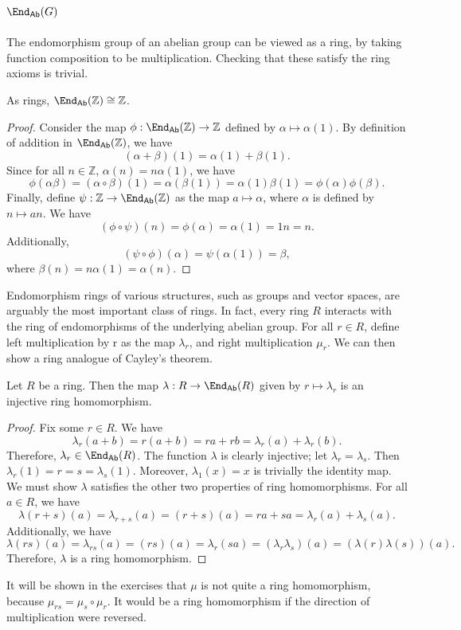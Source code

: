 \subsection{$\End_{\mathsf{Ab}}( G ) $}
The endomorphism group of an abelian group can be viewed as a ring, by taking function composition to be multiplication. Checking that these satisfy the ring axioms is trivial.
\begin{proposition}\label{prp:3.2.3}
	As rings, $\End_{\mathsf{Ab}}( \mathbb{Z} ) \cong \mathbb{Z}$.
\end{proposition}
\begin{proof}
	Consider the map $\phi : \End_{\mathsf{Ab}}( \mathbb{Z} )  \to \mathbb{Z}$ defined by $\alpha \mapsto \alpha (1)$. By definition of addition in $\End_{\mathsf{Ab}}( \mathbb{Z} ) $, we have
	\[
		(\alpha +\beta )(1)=\alpha (1)+\beta (1)
	.\]
	Since for all $n\in\mathbb{Z}$, $\alpha (n)=n\alpha (1)$, we have
	\[
		\phi (\alpha \beta )=(\alpha \circ \beta )(1)=\alpha (\beta (1))=\alpha (1)\beta (1)=\phi (\alpha )\phi (\beta )
	.\]
	Finally, define $\psi : \mathbb{Z} \to \End_{\mathsf{Ab}}( \mathbb{Z} ) $ as the map $a\mapsto \alpha $, where $\alpha $ is defined by $n\mapsto an$. We have
	\[
		(\phi \circ \psi )(n)=\phi (\alpha)=\alpha (1)=1n=n
	.\]
	Additionally,
	\[
		(\psi \circ \phi )(\alpha )=\psi (\alpha (1))=\beta ,
	\]
	where $\beta(n)=n\alpha (1)=\alpha (n)$.
\end{proof}
Endomorphism rings of various structures, such as groups and vector spaces, are arguably the most important class of rings. In fact, every ring $R$ interacts with the ring of endomorphisms of the underlying abelian group. For all $r\in R$, define left multiplication by r as the map $\lambda_r$, and right multiplication $\mu _r$. We can then show a ring analogue of Cayley's theorem.
\begin{proposition}\label{prp:3.2.4}
	Let $R$ be a ring. Then the map $\lambda : R \to \End_{\mathsf{Ab}}( R ) $ given by $r\mapsto \lambda_r$ is an injective ring homomorphism.
\end{proposition}
\begin{proof}
	Fix some $r\in R$. We have
	\[
		\lambda_r(a+b)=r(a+b)=ra+rb=\lambda_r(a)+\lambda_r(b)
	.\]
	Therefore, $\lambda_r\in \End_{\mathsf{Ab}}( R ) $. The function $\lambda $ is clearly injective; let $\lambda_r=\lambda_s$. Then $\lambda_r(1)=r=s=\lambda_s(1)$. Moreover, $\lambda_1(x)=x$ is trivially the identity map. We must show $\lambda $ satisfies the other two properties of ring homomorphisms. For all $a\in R$, we have
	\[
		\lambda (r+s)(a)=\lambda_{r+s}(a)=(r+s)(a)=ra+sa=\lambda_r(a)+\lambda_s(a)
	.\]
	Additionally, we have
	\[
		\lambda(rs)(a)=\lambda_{rs}(a)=(rs)(a)=\lambda_r(sa)=(\lambda_r\lambda_s)(a)=(\lambda(r)\lambda(s))(a)
	.\]
	Therefore, $\lambda $ is a ring homomorphism.
\end{proof}

It will be shown in the exercises that $\mu $ is not quite a ring homomorphism, because $\mu_{rs}=\mu_s \circ \mu_r$. It would be a ring homomorphism if the direction of multiplication were reversed.
